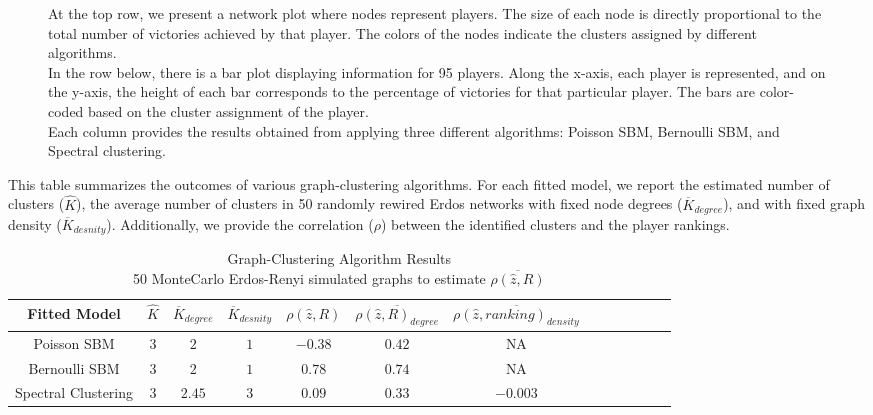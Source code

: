 \documentclass[11pt]{amsart}
\begin{document}
\begin{figure}[h]
{        \label{fig:POMM_adjacency_K5}%
    }
    \caption{At the top row, we present a network plot where nodes represent players. The size of each node is directly proportional to the total number of victories achieved by that player. The colors of the nodes indicate the clusters assigned by different algorithms.
\\
In the row below, there is a bar plot displaying information for 95 players. Along the x-axis, each player is represented, and on the y-axis, the height of each bar corresponds to the percentage of victories for that particular player. The bars are color-coded based on the cluster assignment of the player.
\\
Each column provides the results obtained from applying three different algorithms: Poisson SBM, Bernoulli SBM, and Spectral clustering.}
    \label{fig:all_images}
\end{figure}

This table summarizes the outcomes of various graph-clustering algorithms. For each fitted model, we report the estimated number of clusters ($\hat{K}$), the average number of clusters in 50 randomly rewired Erdos networks with fixed node degrees ($\overline{K}_{degree}$), and with fixed graph density ($\overline{K}_{desnity}$). Additionally, we provide the correlation ($\rho$) between the identified clusters and the player rankings.



\begin{table}[htbp]
\centering
\caption{{\large Graph-Clustering Algorithm Results} \\
{\small 50 MonteCarlo Erdos-Renyi simulated graphs to estimate $\overline{\rho(\hat{z},R)}$}}
\begin{tabular}{ccccccccccccc}
\toprule
\multirow{1}{*}{Fitted Model} & $\hat{K}$ & $\overline{K}_{degree}$ & $\overline{K}_{desnity}$& $\rho(\hat{z},R)$ &$\overline{\rho(\hat{z},R)_{degree}} $& $\overline{\rho(\hat{z},ranking)_{density}}$  \\
\midrule
Poisson SBM & $3$ & $2$ & $1$ & $-0.38$ & $0.42$ & NA \\
Bernoulli SBM & $3$ & $2$ & $1$ & $0.78$ & $0.74$ & NA \\
Spectral Clustering & $3$ & $2.45$ & $3$ & $0.09$ & $0.33$ & $-0.003$ \\
\bottomrule
\end{tabular}
\label{table:simulations_from_simple}
\end{table}

\clearpage
\end{document}
